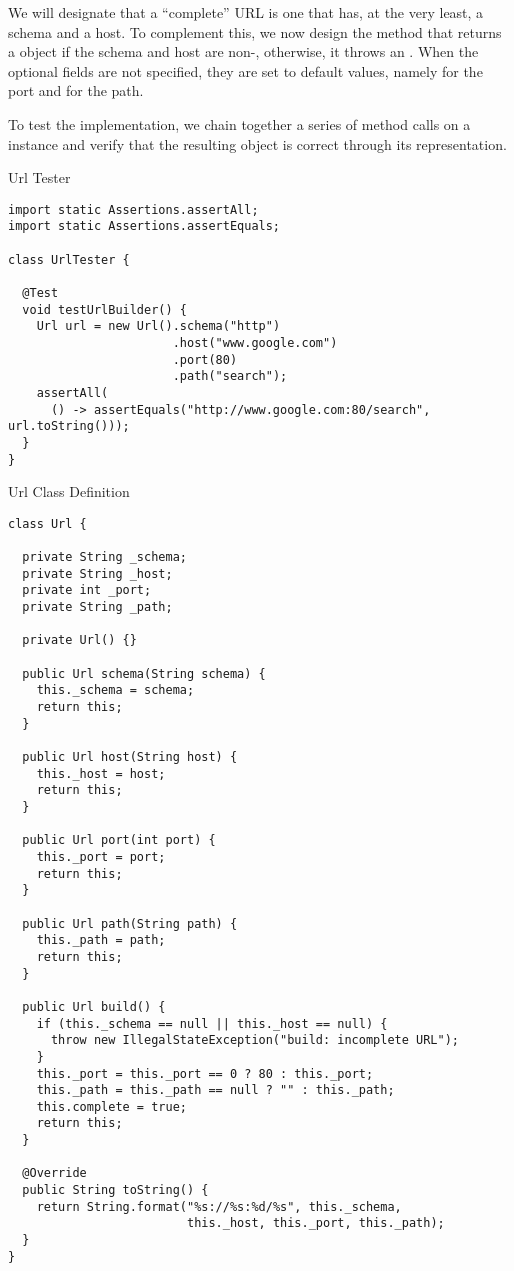 We will designate that a ``complete'' URL is one that has, at the very least, a schema and a host. To complement this, we now design the  method that returns a  object if the schema and host are non-, otherwise, it throws an . When the optional fields are not specified, they are set to default values, namely  for the port and  for the path.

To test the implementation, we chain together a series of method calls on a  instance and verify that the resulting  object is correct through its  representation.

\begin{cl}{Url Tester}
\begin{lstlisting}[language=MyJava]
import static Assertions.assertAll;
import static Assertions.assertEquals;

class UrlTester {

  @Test
  void testUrlBuilder() {
    Url url = new Url().schema("http")
                       .host("www.google.com")
                       .port(80)
                       .path("search");
    assertAll(
      () -> assertEquals("http://www.google.com:80/search", url.toString()));
  }
}
\end{lstlisting}
\end{cl}

\begin{cl}{Url Class Definition}
\begin{lstlisting}[language=MyJava]
class Url {

  private String _schema;
  private String _host;
  private int _port;
  private String _path;
  
  private Url() {}

  public Url schema(String schema) {
    this._schema = schema;
    return this;
  }

  public Url host(String host) {
    this._host = host;
    return this;
  }

  public Url port(int port) {
    this._port = port;
    return this;
  }

  public Url path(String path) {
    this._path = path;
    return this;
  }

  public Url build() {
    if (this._schema == null || this._host == null) {
      throw new IllegalStateException("build: incomplete URL");
    }
    this._port = this._port == 0 ? 80 : this._port;
    this._path = this._path == null ? "" : this._path;
    this.complete = true;
    return this;
  }

  @Override
  public String toString() {
    return String.format("%s://%s:%d/%s", this._schema,
                         this._host, this._port, this._path);
  }
}
\end{lstlisting}
\end{cl}

